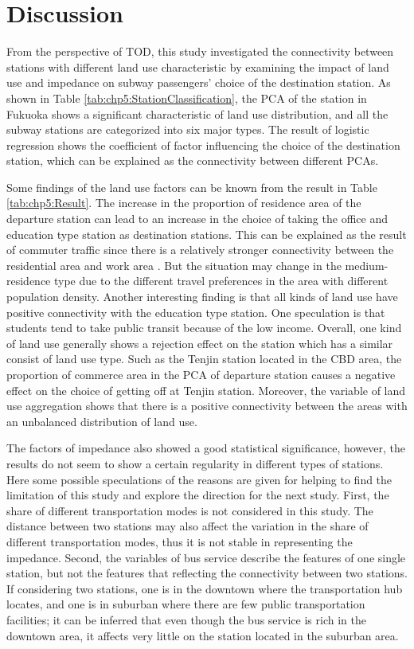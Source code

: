 \section{Discussion}
%
From the perspective of TOD, this study investigated the connectivity between stations with different land use characteristic by examining the impact of land use and impedance on subway passengers' choice of the destination station. As shown in Table \ref{tab:chp5:StationClassification}, the PCA of the station in Fukuoka shows a significant characteristic of land use distribution, and all the subway stations are categorized into six major types. The result of logistic regression shows the coefficient of factor influencing the choice of the destination station, which can be explained as the connectivity between different PCAs.

%
Some findings of the land use factors can be known from the result in Table \ref{tab:chp5:Result}. The increase in the proportion of residence area of the departure station can lead to an increase in the choice of taking the office and education type station as destination stations. This can be explained as the result of commuter traffic since there is a relatively stronger connectivity between the residential area and work area \cite{badoe2000transportation}. But the situation may change in the medium-residence type due to the different travel preferences in the area with different population density. Another interesting finding is that all kinds of land use have positive connectivity with the education type station. One speculation is that students tend to take public transit because of the low income. Overall, one kind of land use generally shows a rejection effect on the station which has a similar consist of land use type. Such as the Tenjin station located in the CBD area, the proportion of commerce area in the PCA of departure station causes a negative effect on the choice of getting off at Tenjin station. Moreover, the variable of land use aggregation shows that there is a positive connectivity between the areas with an unbalanced distribution of land use.

%
The factors of impedance also showed a good statistical significance, however, the results do not seem to show a certain regularity in different types of stations. Here some possible speculations of the reasons are given for helping to find the limitation of this study and explore the direction for the next study. First, the share of different transportation modes is not considered in this study. The distance between two stations may also affect the variation in the share of different transportation modes, thus it is not stable in representing the impedance.  Second, the variables of bus service describe the features of one single station, but not the features that reflecting the connectivity between two stations. If considering two stations, one is in the downtown where the transportation hub locates, and one is in suburban where there are few public transportation facilities; it can be inferred that even though the bus service is rich in the downtown area, it affects very little on the station located in the suburban area.

